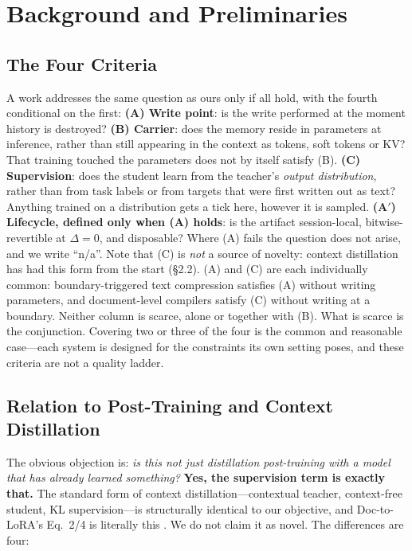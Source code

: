 \documentclass[sigconf,nonacm]{acmart}
\begin{document}
\section{Background and Preliminaries}

\subsection{The Four Criteria}\label{sec:criteria}

A work addresses the same question as ours only if all hold, with the fourth conditional on the first:
\textbf{(A) Write point}: is the write performed at the moment history is destroyed?
\textbf{(B) Carrier}: does the memory reside in parameters at inference, rather than still appearing in the
context as tokens, soft tokens or KV? That training touched the parameters does not by itself satisfy (B).
\textbf{(C) Supervision}: does the student learn from the teacher's \emph{output distribution}, rather than
from task labels or from targets that were first written out as text? Anything trained on a distribution gets
a tick here, however it is sampled.
\textbf{(A$'$) Lifecycle, defined only when (A) holds}: is the artifact session-local, bitwise-revertible at
$\Delta=0$, and disposable? Where (A) fails the question does not arise, and we write ``n/a''.
Note that (C) is \emph{not} a source of novelty: context distillation has had this form from the start
(\S2.2). (A) and (C) are each individually common: boundary-triggered text compression satisfies (A) without
writing parameters, and document-level compilers satisfy (C) without writing at a boundary. Neither column is
scarce, alone or together with (B). What is scarce is the conjunction.
Covering two or three of the four is the common and reasonable case---each system is designed for the
constraints its own setting poses, and these criteria are not a quality ladder.

\subsection{Relation to Post-Training and Context Distillation}

The obvious objection is: \emph{is this not just distillation post-training with a model that has
already learned something?} \textbf{Yes, the supervision term is exactly that.} The standard form of
context distillation---contextual teacher, context-free student, KL supervision---is structurally
identical to our objective, and Doc-to-LoRA's Eq.~2/4 is literally this \cite{doctolora2026,snell2022}.
We do not claim it as novel. The differences are four:
\end{document}

